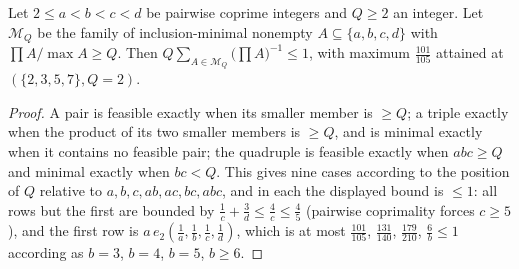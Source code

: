 \begin{lemma}\label{lem:antichain}
Let $2\le a<b<c<d$ be pairwise coprime integers and $Q\ge2$ an integer. Let $\mathcal M_Q$ be the
family of inclusion-minimal nonempty $A\subseteq\{a,b,c,d\}$ with $\prod A/\max A\ge Q$. Then
$Q\sum_{A\in\mathcal M_Q}\bigl(\prod A\bigr)^{-1}\le1$, with maximum $\tfrac{101}{105}$ attained at
$(\{2,3,5,7\},Q=2)$.
\end{lemma}
\begin{proof}
A pair is feasible exactly when its smaller member is $\ge Q$; a triple exactly when the product of
its two smaller members is $\ge Q$, and is minimal exactly when it contains no feasible pair; the
quadruple is feasible exactly when $abc\ge Q$ and minimal exactly when $bc<Q$. This gives nine
cases according to the position of $Q$ relative to $a,b,c,ab,ac,bc,abc$, and in each the displayed
bound is $\le1$: all rows but the first are bounded by $\tfrac1c+\tfrac3d\le\tfrac4c\le\tfrac45$
(pairwise coprimality forces $c\ge5$), and the first row is $a\,e_2(\tfrac1a,\tfrac1b,\tfrac1c,\tfrac1d)$,
which is at most $\tfrac{101}{105}$, $\tfrac{131}{140}$, $\tfrac{179}{210}$, $\tfrac6b\le1$ according
as $b=3$, $b=4$, $b=5$, $b\ge6$.
\end{proof}

